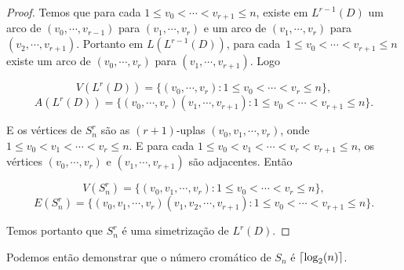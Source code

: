 \begin{proof}
Temos que para cada $1\leq v_0 < \cdots < v_{r+1} \leq n$, existe em $L^{r-1}(D)$ um arco de $(v_0,\cdots,v_{r-1})$ para $(v_1,\cdots,v_r)$ e um arco de $(v_1,\cdots,v_{r})$ para $(v_2,\cdots,v_{r+1})$. Portanto em $L(L^{r-1}(D))$, para cada~$1\leq v_0 < \cdots < v_{r+1} \leq n$ existe um arco de $(v_0,\cdots,v_{r})$ para $(v_1,\cdots,v_{r+1})$. Logo

\[V(L^r(D)) = \{(v_0,\cdots,v_{r}) : 1\leq v_0 < \cdots < v_r \leq n\},\]
\[A(L^r(D)) = \{(v_0,\cdots,v_{r})(v_1,\cdots,v_{r+1}) : 1\leq v_0 < \cdots < v_{r+1} \leq n\}.\]

E os vértices de $S_n^r$ são as $(r+1)$-uplas $(v_0, v_1, \cdots, v_r)$, onde $1\leq v_0 < v_1 < \cdots < v_r \leq n$. E para cada $1 \leq v_0 < v_1 <\cdots < v_r < v_{r+1} \leq n$, os vértices $(v_0, \cdots, v_r)$ e $(v_1, \cdots, v_{r+1})$ são adjacentes. Então 

\[V(S_n^r) = \{(v_0, v_1, \cdots, v_r) : 1 \leq v_0 < \cdots < v_r \leq n\},\]
\[E(S_n^r) = \{(v_0, v_1, \cdots, v_r)(v_1, v_2, \cdots, v_{r+1}) : 1 \leq v_0 < \cdots < v_{r+1} \leq n\}.\]

Temos portanto que $S_n^r$ é uma simetrização de $L^r(D)$.
\end{proof}

Podemos então demonstrar que o número cromático de $S_n$ é $\lceil\log_2(n)\rceil$.

